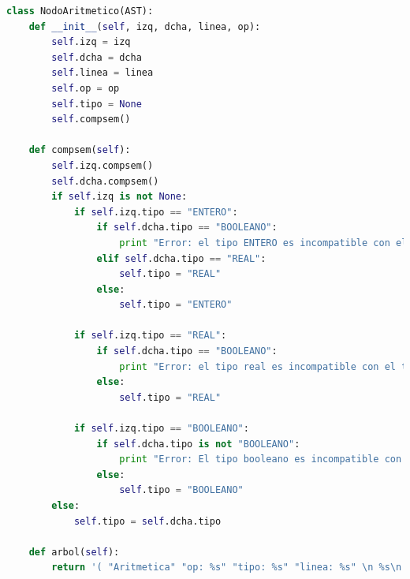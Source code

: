 \documentclass[11pt]{article}
\begin{document}
\begin{minipage}{\linewidth}
    \begin{lstlisting}[language=Python, caption=NodoAritmetico(AST)]          
class NodoAritmetico(AST):
	def __init__(self, izq, dcha, linea, op):
		self.izq = izq
		self.dcha = dcha
		self.linea = linea
		self.op = op
		self.tipo = None
		self.compsem()
	
	def compsem(self):
		self.izq.compsem()
		self.dcha.compsem()
		if self.izq is not None:
			if self.izq.tipo == "ENTERO":
				if self.dcha.tipo == "BOOLEANO":
					print "Error: el tipo ENTERO es incompatible con el tipo booleano (error semantico en linea " + str(self.linea) + ")"
				elif self.dcha.tipo == "REAL":
					self.tipo = "REAL"
				else:
					self.tipo = "ENTERO"

			if self.izq.tipo == "REAL":
				if self.dcha.tipo == "BOOLEANO":
					print "Error: el tipo real es incompatible con el tipo booleano (error semantico en linea " + str(self.linea) + ")"
				else:
					self.tipo = "REAL"
		
			if self.izq.tipo == "BOOLEANO":
				if self.dcha.tipo is not "BOOLEANO":
					print "Error: El tipo booleano es incompatible con tipos no booleanos (error semantico en linea " + str(self.linea) + ")"
				else:
					self.tipo = "BOOLEANO"
		else:
			self.tipo = self.dcha.tipo

	def arbol(self):
		return '( "Aritmetica" "op: %s" "tipo: %s" "linea: %s" \n %s\n %s\n)' % (self.op, self.tipo, self.linea, self.izq, self.dcha)
	\end{lstlisting}
\end{minipage}
\end{document}
